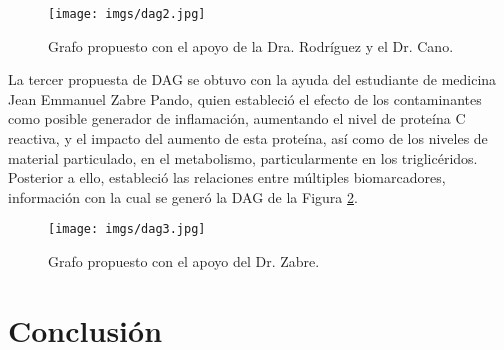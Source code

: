 \documentclass[12pt, letterpaper]{report}
\begin{document}
\begin{figure}[H]
    \centering
    \texttt{[image: imgs/dag2.jpg]}
    \caption{Grafo propuesto con el apoyo de la Dra. Rodríguez y el Dr. Cano.}
    \label{fig:dag2}
\end{figure}

La tercer propuesta de DAG se obtuvo con la ayuda del estudiante de medicina Jean Emmanuel Zabre Pando, quien estableció el efecto de los contaminantes como posible generador de inflamación, aumentando el nivel de proteína C reactiva, y el impacto del aumento de esta proteína, así como de los niveles de material particulado, en el metabolismo, particularmente en los triglicéridos. Posterior a ello, estableció las relaciones entre múltiples biomarcadores, información con la cual se generó la DAG de la Figura \ref{fig:dag3}.

\begin{figure}[H]
    \centering
    \texttt{[image: imgs/dag3.jpg]}
    \caption{Grafo propuesto con el apoyo del Dr. Zabre.}
    \label{fig:dag3}
\end{figure}

\section*{Conclusión}


\printbibliography[title={Referencias}]
\end{document}
